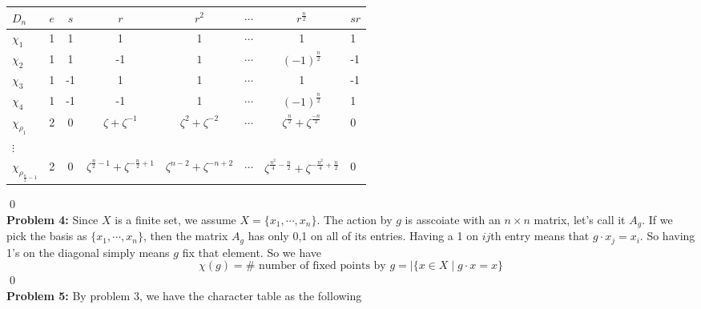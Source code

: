 \documentclass[12pt]{amsart}
\begin{document}
\begin{table}[H]
    \centering
    \begin{tabular}{l|ccccccl}
        $D_n$                         & $e$ & $s$ & $r$                                            & $r^2$                      & $\cdots$ & $r^\frac{n}{2}$                                                        & $sr$ \\ \hline
        $\chi_1$                      & 1   & 1   & 1                                              & 1                          & $\cdots$ & 1                                                                      & 1    \\
        $\chi_2$                      & 1   & 1   & -1                                             & $1$                        & $\cdots$ & $(-1)^\frac{n}{2}$                                                     & -1   \\
        $\chi_3$                      & 1   & -1  & 1                                              & 1                          & $\cdots$ & 1                                                                      & -1   \\
        $\chi_4$                      & 1   & -1  & -1                                             & 1                          & $\cdots$ & $(-1)^\frac{n}{2}$                                                     & 1    \\
        $\chi_{\rho_1} $              & 2   & 0   & $\zeta+\zeta^{-1} $                            & $\zeta^{2}+\zeta^{-2}$     & $\cdots$ & $\zeta^\frac{n}{2}+\zeta^\frac{-n}{2}$                                 & 0    \\
        $\vdots$                                                                                                                                                                                                           \\
        $\chi_{\rho_{\frac{n}{2}-1}}$ & 2   & 0   & $\zeta^{\frac{n}{2}-1}+\zeta^{-\frac{n}{2}+1}$ & $\zeta^{n-2}+\zeta^{-n+2}$ & $\cdots$ & $\zeta^{\frac{n^2}{4}-\frac{n}{2}}+\zeta^{-\frac{n^2}{4}+\frac{n}{2}}$ & 0
    \end{tabular}
\end{table}
\qed\\
\textbf{Problem 4:} Since $X$ is a finite set, we assume $X=\{x_1,\cdots ,x_n\}$. The action by $g$ is asscoiate with an $n\times n$ matrix, let's call it $A_g$. If we pick the basis as $\{x_1,\cdots ,x_n\}$, then the matrix $A_g$ has only 0,1 on all of its entries. Having a 1 on $ij$th entry means that $g\cdot x_j=x_i$. So having 1's on the diagonal simply means $g$ fix that element. So we have
\[\chi(g)=\#\text{ number of fixed points by }g=|\{x\in X\mid g\cdot x =x \}\]
\qed\\
\textbf{Problem 5:} By problem 3, we have the character table as the following 
\end{document}
